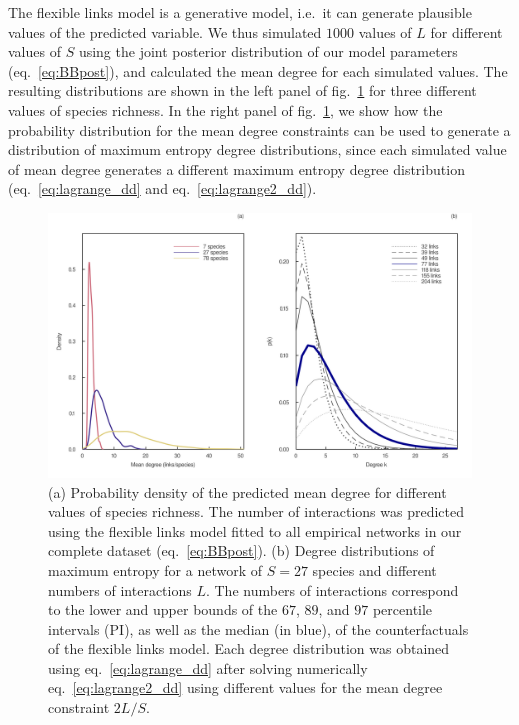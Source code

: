 \documentclass[10pt,oneside]{article}
\makeatletter
\def\maxwidth{\ifdim\Gin@nat@width>\linewidth\linewidth
\else\Gin@nat@width\fi}
\let\Oldincludegraphics\includegraphics
\renewcommand{\includegraphics}[1]{\Oldincludegraphics[width=\maxwidth]{#1}}
\makeatother
\begin{document}
The flexible links model is a generative model, i.e.~it can generate
plausible values of the predicted variable. We thus simulated \(1000\)
values of \(L\) for different values of \(S\) using the joint posterior
distribution of our model parameters (eq.~\ref{eq:BBpost}), and
calculated the mean degree for each simulated values. The resulting
distributions are shown in the left panel of
fig.~\ref{fig:degree_dist_fl} for three different values of species
richness. In the right panel of fig.~\ref{fig:degree_dist_fl}, we show
how the probability distribution for the mean degree constraints can be
used to generate a distribution of maximum entropy degree distributions,
since each simulated value of mean degree generates a different maximum
entropy degree distribution (eq.~\ref{eq:lagrange_dd} and
eq.~\ref{eq:lagrange2_dd}).

\begin{figure}
\hypertarget{fig:degree_dist_fl}{%
\centering
\includegraphics{figures/maxent_degree_dist_fl.png}
\caption{(a) Probability density of the predicted mean degree for
different values of species richness. The number of interactions was
predicted using the flexible links model fitted to all empirical
networks in our complete dataset (eq.~\ref{eq:BBpost}). (b) Degree
distributions of maximum entropy for a network of \(S=27\) species and
different numbers of interactions \(L\). The numbers of interactions
correspond to the lower and upper bounds of the \(67%
\), \(89%
\), and \(97%
\) percentile intervals (PI), as well as the median (in blue), of the
counterfactuals of the flexible links model. Each degree distribution
was obtained using eq.~\ref{eq:lagrange_dd} after solving numerically
eq.~\ref{eq:lagrange2_dd} using different values for the mean degree
constraint \(2L/S\).}\label{fig:degree_dist_fl}
}
\end{figure}
\end{document}
